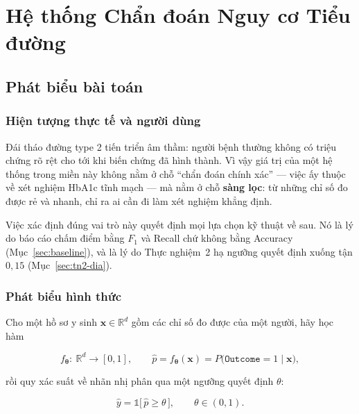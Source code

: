 \chapter{Hệ thống Chẩn đoán Nguy cơ Tiểu đường}
\label{ch:tieuduong}

\section{Phát biểu bài toán}
\label{sec:phatbieu-dia}

\subsection{Hiện tượng thực tế và người dùng}

Đái tháo đường type 2 tiến triển âm thầm: người bệnh thường không có triệu
chứng rõ rệt cho tới khi biến chứng đã hình thành. Vì vậy giá trị của một hệ
thống trong miền này không nằm ở chỗ ``chẩn đoán chính xác'' --- việc ấy thuộc
về xét nghiệm HbA1c tĩnh mạch --- mà nằm ở chỗ \textbf{sàng lọc}: từ những chỉ
số đo được rẻ và nhanh, chỉ ra ai cần đi làm xét nghiệm khẳng định.

Việc xác định đúng vai trò này quyết định mọi lựa chọn kỹ thuật về sau. Nó là
lý do báo cáo chấm điểm bằng $F_1$ và Recall chứ không bằng Accuracy
(Mục~\ref{sec:baseline}), và là lý do Thực nghiệm~2 hạ ngưỡng quyết định xuống
tận $0{,}15$ (Mục~\ref{sec:tn2-dia}).

\subsection{Phát biểu hình thức}

Cho một hồ sơ y sinh $\mathbf{x}\in\mathbb{R}^{d}$ gồm các chỉ số đo được của
một người, hãy học hàm

\begin{equation}
f_{\bm\theta}:\ \mathbb{R}^{d}\longrightarrow[0,1],
\qquad
\hat p = f_{\bm\theta}(\mathbf{x}) = P\big(\texttt{Outcome}=1 \mid \mathbf{x}\big),
\label{eq:baitoan-dia}
\end{equation}

\noindent rồi quy xác suất về nhãn nhị phân qua một ngưỡng quyết định $\theta$:

\begin{equation}
\hat y = \mathbb{1}\big[\,\hat p \ge \theta\,\big],
\qquad \theta \in (0,1).
\label{eq:nguong-dia}
\end{equation}

